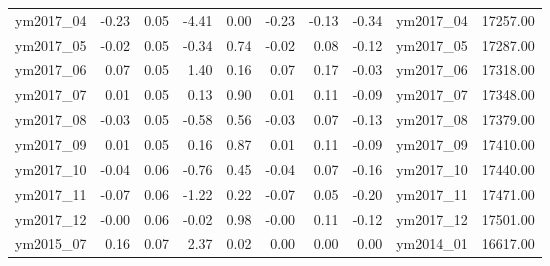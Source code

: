 \begin{table}[ht]
\begin{tabular}{rrrrrrrrlr}
  ym2017\_04 & -0.23 & 0.05 & -4.41 & 0.00 & -0.23 & -0.13 & -0.34 & ym2017\_04 & 17257.00 \\ 
  ym2017\_05 & -0.02 & 0.05 & -0.34 & 0.74 & -0.02 & 0.08 & -0.12 & ym2017\_05 & 17287.00 \\ 
  ym2017\_06 & 0.07 & 0.05 & 1.40 & 0.16 & 0.07 & 0.17 & -0.03 & ym2017\_06 & 17318.00 \\ 
  ym2017\_07 & 0.01 & 0.05 & 0.13 & 0.90 & 0.01 & 0.11 & -0.09 & ym2017\_07 & 17348.00 \\ 
  ym2017\_08 & -0.03 & 0.05 & -0.58 & 0.56 & -0.03 & 0.07 & -0.13 & ym2017\_08 & 17379.00 \\ 
  ym2017\_09 & 0.01 & 0.05 & 0.16 & 0.87 & 0.01 & 0.11 & -0.09 & ym2017\_09 & 17410.00 \\ 
  ym2017\_10 & -0.04 & 0.06 & -0.76 & 0.45 & -0.04 & 0.07 & -0.16 & ym2017\_10 & 17440.00 \\ 
  ym2017\_11 & -0.07 & 0.06 & -1.22 & 0.22 & -0.07 & 0.05 & -0.20 & ym2017\_11 & 17471.00 \\ 
  ym2017\_12 & -0.00 & 0.06 & -0.02 & 0.98 & -0.00 & 0.11 & -0.12 & ym2017\_12 & 17501.00 \\ 
  ym2015\_07 & 0.16 & 0.07 & 2.37 & 0.02 & 0.00 & 0.00 & 0.00 & ym2014\_01 & 16617.00 \\ 
   \hline
\end{tabular}
\end{table}